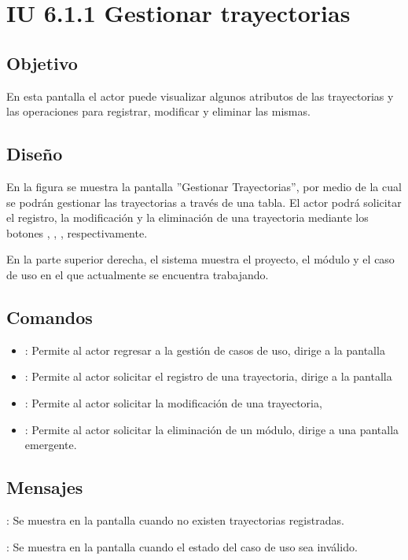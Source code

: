 \section{IU 6.1.1 Gestionar trayectorias}

\subsection{Objetivo}
	En esta pantalla el actor puede visualizar algunos atributos de las trayectorias y las operaciones para registrar, modificar y eliminar las mismas.
\subsection{Diseño}
	En la figura  se muestra la pantalla ''Gestionar Trayectorias'', por medio de la cual se podrán gestionar las trayectorias a través de una tabla. El actor podrá solicitar el registro, la modificación y la eliminación de una trayectoria mediante los botones , \editar, \eliminar, respectivamente.
	
	En la parte superior derecha, el sistema muestra el proyecto, el módulo y el caso de uso en el que actualmente se encuentra trabajando.

\subsection{Comandos}
\begin{itemize}
	\item {}: Permite al actor regresar a la gestión de casos de uso, dirige a la pantalla 
	\item {}: Permite al actor solicitar el registro de una trayectoria, dirige a la pantalla 
	\item \editar [Modificar]: Permite al actor solicitar la modificación de una trayectoria, 
	\item \eliminar [Eliminar]: Permite al actor solicitar la eliminación de un módulo, dirige a una pantalla emergente.
\end{itemize}

\subsection{Mensajes}

\begin{Citemize}
	\item {}: Se muestra en la pantalla  cuando no existen trayectorias registradas.
	\item {}: Se muestra en la pantalla  cuando el estado del caso de uso sea inválido.
\end{Citemize}
